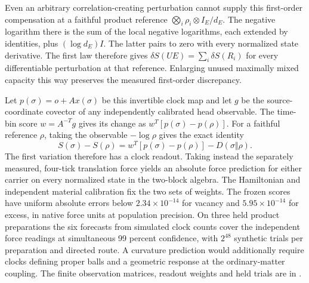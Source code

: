 \documentclass[11pt]{article}
\begin{document}
Even an arbitrary correlation-creating perturbation cannot supply
this first-order compensation at a faithful product reference
$\bigotimes_i\rho_i\otimes I_E/d_E$. The negative logarithm there
is the sum of the local negative logarithms, each extended by
identities, plus $(\log d_E)I$. The latter pairs to zero with every
normalized state derivative. The first law therefore gives
$\delta S(UE)=\sum_i\delta S(R_i)$ for every differentiable
perturbation at that reference. Enlarging unused maximally mixed
capacity this way preserves the measured first-order discrepancy.

Let $p(\sigma)=o+A x(\sigma)$ be this invertible clock map and
let $g$ be the source-coordinate covector of any independently
calibrated head observable. The time-bin score $w=A^{-T}g$ gives its
change as $w^T[p(\sigma)-p(\rho)]$. For a faithful reference
$\rho$, taking the observable $-\log\rho$ gives the exact identity
\[
 S(\sigma)-S(\rho)=w^T[p(\sigma)-p(\rho)]-D(\sigma\Vert\rho).
\]
The first variation therefore has a clock readout. Taking instead
the separately measured, four-tick translation force yields an
absolute force prediction for either carrier on every normalized
state in the two-block algebra. The Hamiltonian and independent
material calibration fix the two sets of weights. The frozen scores
have uniform absolute errors below $2.34\times10^{-14}$ for vacancy
and $5.95\times10^{-14}$ for excess, in native force units at
population precision. On three held product preparations the six
forecasts from simulated clock counts cover the independent force
readings at simultaneous 99 percent confidence, with $2^{48}$
synthetic trials per preparation and directed route. A curvature
prediction would additionally require clocks defining proper balls
and a geometric response at the ordinary-matter coupling. The
finite observation matrices, readout weights and held trials are in
.
\end{document}
